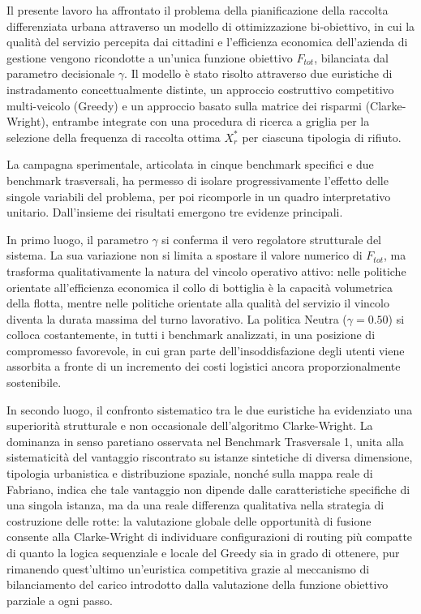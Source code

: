 Il presente lavoro ha affrontato il problema della pianificazione della raccolta differenziata urbana attraverso un modello di ottimizzazione bi-obiettivo, in cui la qualità del servizio percepita dai cittadini e l'efficienza economica dell'azienda di gestione vengono ricondotte a un'unica funzione obiettivo $F_{tot}$, bilanciata dal parametro decisionale $\gamma$. Il modello è stato risolto attraverso due euristiche di instradamento concettualmente distinte, un approccio costruttivo competitivo multi-veicolo (Greedy) e un approccio basato sulla matrice dei risparmi (Clarke-Wright), entrambe integrate con una procedura di ricerca a griglia per la selezione della frequenza di raccolta ottima $X_r^*$ per ciascuna tipologia di rifiuto.

La campagna sperimentale, articolata in cinque benchmark specifici e due benchmark trasversali, ha permesso di isolare progressivamente l'effetto delle singole variabili del problema, per poi ricomporle in un quadro interpretativo unitario. Dall'insieme dei risultati emergono tre evidenze principali.

In primo luogo, il parametro $\gamma$ si conferma il vero regolatore strutturale del sistema. La sua variazione non si limita a spostare il valore numerico di $F_{tot}$, ma trasforma qualitativamente la natura del vincolo operativo attivo: nelle politiche orientate all'efficienza economica il collo di bottiglia è la capacità volumetrica della flotta, mentre nelle politiche orientate alla qualità del servizio il vincolo diventa la durata massima del turno lavorativo. La politica Neutra ($\gamma = 0.50$) si colloca costantemente, in tutti i benchmark analizzati, in una posizione di compromesso favorevole, in cui gran parte dell'insoddisfazione degli utenti viene assorbita a fronte di un incremento dei costi logistici ancora proporzionalmente sostenibile.

In secondo luogo, il confronto sistematico tra le due euristiche ha evidenziato una superiorità strutturale e non occasionale dell'algoritmo Clarke-Wright. La dominanza in senso paretiano osservata nel Benchmark Trasversale 1, unita alla sistematicità del vantaggio riscontrato su istanze sintetiche di diversa dimensione, tipologia urbanistica e distribuzione spaziale, nonché sulla mappa reale di Fabriano, indica che tale vantaggio non dipende dalle caratteristiche specifiche di una singola istanza, ma da una reale differenza qualitativa nella strategia di costruzione delle rotte: la valutazione globale delle opportunità di fusione consente alla Clarke-Wright di individuare configurazioni di routing più compatte di quanto la logica sequenziale e locale del Greedy sia in grado di ottenere, pur rimanendo quest'ultimo un'euristica competitiva grazie al meccanismo di bilanciamento del carico introdotto dalla valutazione della funzione obiettivo parziale a ogni passo.

